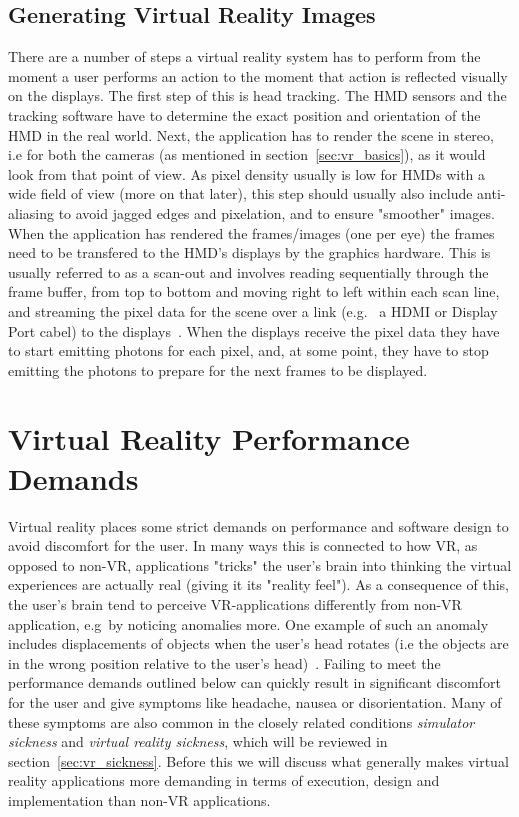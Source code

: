 \subsection{Generating Virtual Reality Images}
There are a number of steps a virtual reality system has to perform from the moment a user performs an action to the moment that action is reflected visually on the displays.
The first step of this is head tracking. The HMD sensors and the tracking software have to determine the exact position and orientation of the HMD in the 
real world. Next, the application has to render the scene in stereo, i.e for both the cameras (as mentioned in section~\vref{sec:vr_basics}), 
as it would look from that point of view. As pixel density usually is low for HMDs with a wide field of view (more on that later), this step should usually 
also include anti-aliasing to avoid jagged edges and pixelation, and to ensure "smoother" images. When the application has rendered the frames/images (one per eye)
the frames need to be transfered to the HMD's displays by the graphics hardware. This is usually referred to as a scan-out and involves reading sequentially through the 
frame buffer, from top to bottom and moving right to left within each scan line, and streaming the pixel data for the scene over a link (e.g.~ a HDMI or Display Port cabel) 
to the displays~\citep{Abrash2012}. When the displays receive the pixel data they have to start emitting photons for each pixel, and, at some point, they 
have to stop emitting the photons to prepare for the next frames to be displayed. 


\section{Virtual Reality Performance Demands}
Virtual reality places some strict demands on performance and software design to avoid discomfort for the user. In many ways this is connected to how VR, 
as opposed to non-VR, applications "tricks" the user's brain into thinking the virtual experiences are actually real (giving it its "reality feel"). 
As a consequence of this, the user's brain tend to perceive VR-applications differently from non-VR application, e.g~by noticing anomalies more. 
One example of such an anomaly includes displacements of objects when the user's head rotates (i.e the objects are in the wrong position 
relative to the user's head)~\citep{Abrash2012}. 
Failing to meet the performance demands outlined below can quickly result in significant discomfort for the user and give symptoms like 
headache, nausea or disorientation. Many of these symptoms are also common in the closely related conditions \textit{simulator sickness} and \textit{virtual reality sickness},
which will be reviewed in section~\vref{sec:vr_sickness}.  
Before this we will discuss what generally makes virtual reality applications more demanding in terms of execution, design and implementation than non-VR applications.


